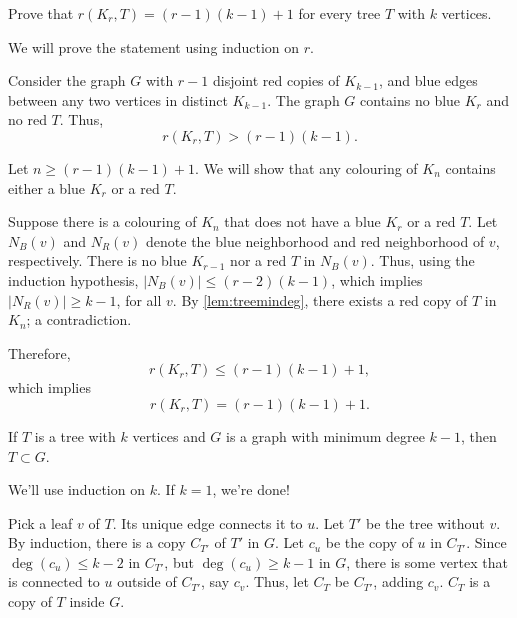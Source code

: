 \documentclass[10pt, a4paper]{article}
\begin{document}
\newpage
\begin{prob}
	Prove that $r(K_r, T) = (r-1)(k-1) + 1$ for every tree $T$ with $k$ vertices.
\end{prob}
\begin{sol}
	We will prove the statement using induction on $r$.

	Consider the graph $G$ with $r-1$ disjoint red copies of $K_{k-1}$, and blue edges between any two vertices in distinct $K_{k-1}$. The graph $G$ contains no blue $K_r$ and no red $T$. Thus,  \[
		r(K_r, T) > (r-1)(k-1).
	\]

	Let $n \ge (r-1)(k-1) + 1$. We will show that any colouring of $K_n$ contains either a blue $K_r$ or a red $T$.

	Suppose there is a colouring of $K_n$ that does not have a blue $K_r$ or a red $T$.
	Let $N_B(v)$ and $N_R(v)$ denote the blue neighborhood and red neighborhood of $v$, respectively. There is no blue $K_{r-1}$ nor a red $T$ in $N_B(v)$. Thus, using the induction hypothesis, $|N_B(v)| \le (r-2)(k-1)$, which implies $|N_R(v)| \ge k-1$, for all $v$. By \cref{lem:treemindeg}, there exists a red copy of $T$ in $K_n$; a contradiction.

	Therefore,  \[
		r(K_r, T) \le (r-1)(k-1) + 1,
	\]
	which implies \[
		r(K_r, T) = (r-1)(k-1) + 1.
	\]
\end{sol}
\begin{lem}\label{lem:treemindeg}
	If $T$ is a tree with $k$ vertices and $G$ is a graph with minimum degree $k-1$, then $T \subset G$.
\end{lem}
\begin{dem}	
		We'll use induction on $k$. If $k = 1$, we're done!

		Pick a leaf $v$ of $T$. Its unique edge connects it to $u$. Let $T'$ be the tree without $v$. By induction, there is a copy $C_{T'}$ of $T'$ in $G$. Let $c_u$ be the copy of  $u$ in $C_{T'}$. Since $\deg(c_u) \leqslant k - 2$ in $C_{T'}$, but $\deg(c_u) \geqslant k-1$ in $G$, there is some vertex that is connected to $u$ outside of $C_{T'}$, say $c_v$. Thus, let $C_{T}$ be $C_{T'}$, adding $c_v$. $C_{T}$ is a copy of $T$ inside $G$.
\end{dem}
\end{document}
